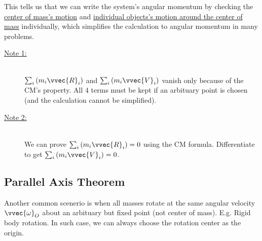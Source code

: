 \documentclass[class=article, crop=false, 12pt]{standalone}
\begin{document}
This tells us that we can write the system's angular momentum by checking the \underline{center of mass's motion} and \underline{individual objects's motion around the center of mass} individually,
which simplifies the calculation to angular momentum in many problems. 

\begin{description}
    \item[\underline{Note 1:}]~\\
     $\sum_i\qty(m_i\vvec{R}_i)$ and $\sum_i\qty(m_i\vvec{V}_i)$ vanish only because of the CM's property. 
    All 4 terms must be kept if an arbituary point is chosen (and the calculation cannot be simplified).
    \item[\underline{Note 2:}]~\\
    We can prove $\sum_i\qty(m_i\vvec{R}_i) = 0$ using the CM formula. Differentiate to get $\sum_i\qty(m_i\vvec{V}_i) = 0$.
\end{description}


\subsection{Parallel Axis Theorem}

Another common scenerio is when all masses rotate at the same angular velocity $\vvec{\omega}_O$ about an arbituary but fixed point (not center of mass). E.g. Rigid body rotation.
In such case, we can always choose the rotation center as the origin. 

\end{document}
